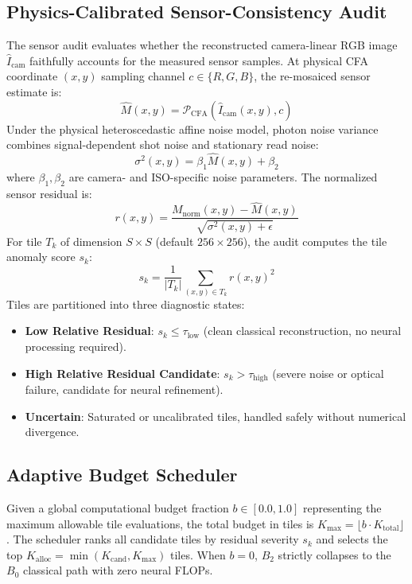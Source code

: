 \documentclass[10pt,twocolumn]{article}
\begin{document}
\subsection{Physics-Calibrated Sensor-Consistency Audit}
The sensor audit evaluates whether the reconstructed camera-linear RGB image $\hat{I}_{\text{cam}}$ faithfully accounts for the measured sensor samples. At physical CFA coordinate $(x, y)$ sampling channel $c \in \{R, G, B\}$, the re-mosaiced sensor estimate is:
\begin{equation}
    \hat{M}(x, y) = \mathcal{P}_{\text{CFA}}\left(\hat{I}_{\text{cam}}(x, y), c\right)
\end{equation}
Under the physical heteroscedastic affine noise model, photon noise variance combines signal-dependent shot noise and stationary read noise:
\begin{equation}
    \sigma^2(x, y) = \beta_1 \hat{M}(x, y) + \beta_2
\end{equation}
where $\beta_1, \beta_2$ are camera- and ISO-specific noise parameters. The normalized sensor residual is:
\begin{equation}
    r(x, y) = \frac{M_{\text{norm}}(x, y) - \hat{M}(x, y)}{\sqrt{\sigma^2(x, y) + \epsilon}}
\end{equation}
For tile $T_k$ of dimension $S \times S$ (default $256 \times 256$), the audit computes the tile anomaly score $s_k$:
\begin{equation}
    s_k = \frac{1}{|T_k|} \sum_{(x, y) \in T_k} r(x, y)^2
\end{equation}
Tiles are partitioned into three diagnostic states:
\begin{itemize}
    \item \textbf{Low Relative Residual}: $s_k \le \tau_{\text{low}}$ (clean classical reconstruction, no neural processing required).
    \item \textbf{High Relative Residual Candidate}: $s_k > \tau_{\text{high}}$ (severe noise or optical failure, candidate for neural refinement).
    \item \textbf{Uncertain}: Saturated or uncalibrated tiles, handled safely without numerical divergence.
\end{itemize}

\subsection{Adaptive Budget Scheduler}
Given a global computational budget fraction $b \in [0.0, 1.0]$ representing the maximum allowable tile evaluations, the total budget in tiles is $K_{\text{max}} = \lfloor b \cdot K_{\text{total}} \rfloor$. The scheduler ranks all candidate tiles by residual severity $s_k$ and selects the top $K_{\text{alloc}} = \min(K_{\text{cand}}, K_{\text{max}})$ tiles. When $b = 0$, $B_2$ strictly collapses to the $B_0$ classical path with zero neural FLOPs.
\end{document}
